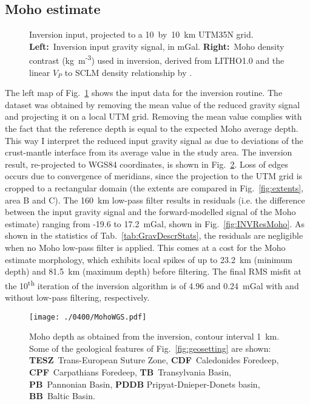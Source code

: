 \subsection{Moho estimate}
\label{ss:Appl:DiscGravMoho}

\begin{figure}
	\begin{adjustbox}{center}
	\end{adjustbox}
	\caption[Inversion input, projected to a 10~by~\SI{10}{\kilo \metre} UTM35N grid.]{Inversion input, projected to a 10~by~\SI{10}{\kilo \metre} UTM35N grid. \textbf{Left:}~Inversion input gravity signal, in mGal. \textbf{Right:}~Moho density contrast (kg~m\textsuperscript{-3}) used in inversion, derived from {LITHO1.0} \parencite{Pasyanos2014} and the linear $V_P$ to SCLM density relationship by \textcite{Yegorova2015}.}
	\label{fig:INVinput}
\end{figure}

The left map of Fig.~\ref{fig:INVinput} shows the input data for the inversion routine.
The dataset was obtained by removing the mean value of the reduced gravity signal and projecting it on a local UTM grid.
Removing the mean value complies with the fact that the reference depth is equal to the expected Moho average depth.
This way I interpret the reduced input gravity signal as due to deviations of the crust-mantle interface from its average value in the study area.
The inversion result, re-projected to WGS84 coordinates, is shown in Fig.~\ref{fig:INVMoho}.
Loss of edges occurs due to convergence of meridians, since the projection to the UTM grid is cropped to a rectangular domain (the extents are compared in Fig.~\ref{fig:extents}, area B and C).
The 160~\si{\kilo \metre} low-pass filter results in residuals (i.e. the difference between the input gravity signal and the forward-modelled signal of the Moho estimate) ranging from -19.6 to 17.2~mGal, shown in Fig.~\ref{fig:INVResMoho}.
As shown in the statistics of Tab.~\ref{tab:GravDescrStats}, the residuals are negligible when no Moho low-pass filter is applied.
This comes at a cost for the Moho estimate morphology, which exhibits local spikes of up to 23.2~\si{\kilo \metre} (minimum depth) and 81.5~\si{\kilo \metre} (maximum depth) before filtering.
The final RMS misfit at the 10\textsuperscript{th} iteration of the inversion algorithm is of 4.96 and 0.24~mGal with and without low-pass filtering, respectively.

\begin{figure}
	\begin{adjustbox}{center}
	\texttt{[image: ./0400/MohoWGS.pdf]}
	\end{adjustbox}
	\caption[Moho depth as obtained from the inversion.]{Moho depth as obtained from the inversion, contour interval 1~\si{\kilo \metre}. Some of the geological features of Fig.~\ref{fig:geosetting} are shown: \textbf{TESZ}~Trans-European Suture Zone, \textbf{CDF}~Caledonides Foredeep, \textbf{CPF}~Carpathians Foredeep, \textbf{TB}~Transylvania Basin, \textbf{PB}~Pannonian Basin, \textbf{PDDB} Pripyat-Dnieper-Donets basin, \textbf{BB}~Baltic Basin.}
	\label{fig:INVMoho}
\end{figure}


